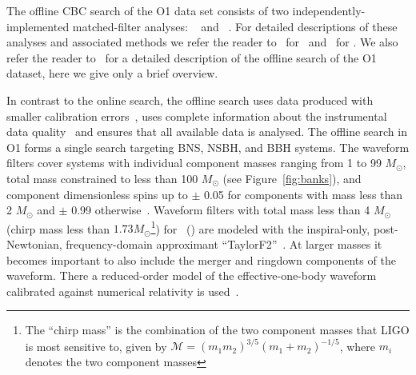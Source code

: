 The offline \ac{CBC} search of the \ac{O1} data set consists of two independently-implemented matched-filter
analyses: \gstlal~\citep{Messick:2016aqy} and
\pycbc~\citep{Usman:2015kfa}.
For detailed descriptions of these analyses and associated methods we refer the reader
to~\citep{Babak:2012zx,Canton:2014ena,Usman:2015kfa} for \pycbc\
and~\citep{Cannon:2011vi, Cannon:2012zt, Privitera:2013xza, Messick:2016aqy} for \gstlal.
We also refer the reader to~\citep{TheLIGOScientific:2016pea, TheLIGOScientific:2016qqj} for a detailed
description of the offline search of the \ac{O1} dataset, here we give only a brief overview.

In contrast to the online search, the offline search uses data produced with
smaller calibration errors~\citep{Abbott:2016jsd}, uses complete information about the instrumental
data quality~\citep{TheLIGOScientific:2016zmo} and ensures that all available data is analysed.
The offline search in \ac{O1} forms a single search targeting \ac{BNS}, \ac{NSBH}, and \ac{BBH} systems. The
waveform filters cover systems with individual
component masses ranging from 1 to 99 $M_{\odot}$, total mass
constrained to less than 100 $M_{\odot}$ (see Figure~\ref{fig:banks}), and component dimensionless spins up to $\pm$ 0.05
for components with mass less than 2 $M_{\odot}$ and $\pm$ 0.99 otherwise~\citep{TheLIGOScientific:2016pea,Capano:2016dsf}.
Waveform filters with total mass less than 4 $M_{\odot}$ (chirp mass less than
$1.73 {M}_{\odot}$\footnote{\label{foot:note1}The
``chirp mass'' is the combination of the two component masses that
\ac{LIGO} is most sensitive to, given by $\mathcal{M} = (m_1 m_2)^{3/5} (m_1 + m_2)^{-1/5}$, where
$m_i$ denotes the two component masses})
for \pycbc\ (\gstlal) are modeled with the
inspiral-only, post-Newtonian, frequency-domain approximant
``TaylorF2''~\citep{Arun:2008kb,Bohe:2013cla,Blanchet:2013haa,Bohe:2015ana,Mishra:2016whh}.
At larger masses it becomes important to also include the merger and ringdown components of the waveform.
There a reduced-order model of the effective-one-body waveform calibrated against numerical
relativity is used~\citep{Taracchini:2013rva,Purrer:2015tud}. 
